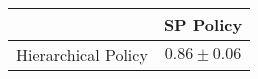 \begin{tabular}{cc}
\toprule
& SP Policy\\
\midrule
Hierarchical Policy  & $0.86\pm0.06$ \\
\bottomrule 
\end{tabular}
